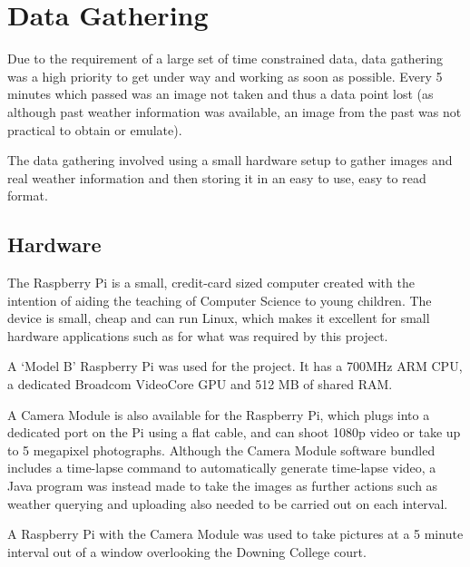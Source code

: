 \documentclass[a4paper,12pt,twoside]{report}
\begin{document}
\section{Data Gathering}
Due to the requirement of a large set of time constrained data, data gathering was a high priority to get under way and working as soon as possible. Every 5 minutes which passed was an image not taken and thus a data point lost (as although past weather information was available, an image from the past was not practical to obtain or emulate).

The data gathering involved using a small hardware setup to gather images and real weather information and then storing it in an easy to use, easy to read format.

\subsection{Hardware}
The Raspberry Pi\cite{RPi} is a small, credit-card sized computer created with the intention of aiding the teaching of Computer Science to young children. The device is small, cheap and can run Linux, which makes it excellent for small hardware applications such as for what was required by this project.

A `Model B' Raspberry Pi was used for the project. It has a 700MHz ARM CPU, a dedicated Broadcom VideoCore GPU and 512 MB of shared RAM\cite{pispecs}.

A Camera Module\cite{RPiCam} is also available for the Raspberry Pi, which plugs into a dedicated port on the Pi using a flat cable, and can shoot 1080p video or take up to 5 megapixel photographs. Although the Camera Module software bundled includes a time-lapse command to automatically generate time-lapse video, a Java program was instead made to take the images as further actions such as weather querying and uploading also needed to be carried out on each interval.

A Raspberry Pi with the Camera Module was used to take pictures at a 5 minute interval out of a window overlooking the Downing College court.
\end{document}
